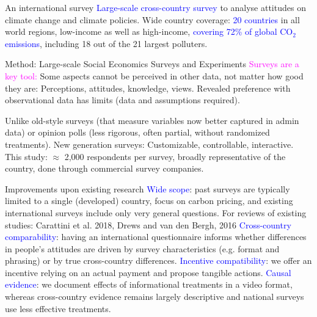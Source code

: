\begin{frame}{An international survey}
\bbvs
\ip \textcolor{blue}{Large-scale cross-country survey} to analyse attitudes on climate change and climate policies.
\ip Wide country coverage:
\bbvs
\ip \textcolor{blue}{20 countries} in all world regions, low-income as well as high-income, 
\ip \textcolor{blue}{covering 72\% of global CO$_\text{2}$ emissions}, including 18 out of the 21 largest polluters.
\ee
\ee
{}
\end{frame}

\begin{frame}{Method: Large-scale Social Economics Surveys and Experiments}
\bb
\ip \textcolor{magenta}{Surveys are a key tool:}
\bbs 
\ip Some aspects cannot be perceived in other data, not matter how good they are: Perceptions, attitudes, knowledge, views.
\ip Revealed preference with observational data has limits (data and assumptions required).

\ip Unlike old-style surveys (that measure variables now better captured in admin data) or opinion polls (less rigorous, often partial, without randomized treatments). 
\ip New generation surveys: Customizable, controllable, interactive.
\ee
\ip This study: $\approx$ 2,000 respondents per survey, broadly representative of the country, done through commercial survey companies. 
\ee
\end{frame}

\begin{frame}{Improvements upon existing research}
\bbs
\ip \textcolor{blue}{Wide scope}: past surveys are typically limited to a single (developed) country, focus on carbon pricing,
and existing international surveys include only very general questions.
\bbs
\ip For reviews of existing studies: Carattini et al. 2018, Drews and van den Bergh, 2016
\ee 
\ip \textcolor{blue}{Cross-country comparability}: having an international questionnaire informs whether differences in people’s attitudes are driven by survey characteristics (e.g. format and phrasing) or by true cross-country differences.
\ip \textcolor{blue}{Incentive compatibility}: we offer an incentive relying on an actual payment and propose tangible actions.
\ip \textcolor{blue}{Causal evidence}: we document effects of informational treatments in a video format, whereas cross-country evidence remains largely descriptive and national surveys use less effective treatments.
\ee
\end{frame}


